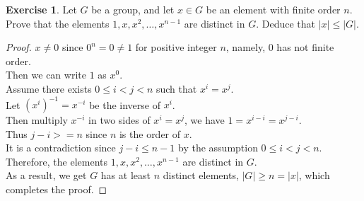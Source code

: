 \documentclass{amsart}
\theoremstyle{plain}
\theoremstyle{definition}
\newtheorem{exer}[lem]{Exercise}
\begin{document}
\begin{exer}
Let $G$ be a group, and let $x\in G$ be an element with finite order $n$.
Prove that the elements $1,x,x^2,\ldots,x^{n-1}$ are distinct in $G$.
Deduce that $|x|\leq|G|$.
\begin{proof}
	 $x \neq 0$ since $0^n = 0 \neq 1$ for positive integer $n$, namely, 0 has not finite order.\\
	 Then we can write $1$ as $x^0$. \\
	 Assume there exists $0\leq i<j<n$ such that $x^i = x^j$.\\
	 Let $(x^i)^{-1} = x^{-i}$ be the inverse of $x^i$.\\
	 Then multiply $x^{-i}$ in two sides of $x^i = x^j$, we have $1=x^{i-i} = x^{j-i}$. \\
	 Thus $j-i >=n$ since $n$ is the order of $x$. \\
	 It is a contradiction since $j-i \leq n-1$ by the assumption $0\leq i<j<n$.\\
	 Therefore, the elements $1,x,x^2,\ldots,x^{n-1}$ are distinct in $G$.\\
	 As a result, we get $G$ has at least $n$ distinct elements, $|G| \geq n = |x|$, which completes the proof.
\end{proof}

\end{exer}
\end{document}
